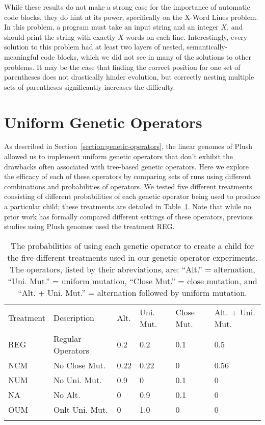 While these results do not make a strong case for the importance of automatic code blocks, they do hint at its power, specifically on the X-Word Lines problem. In this problem, a program must take an input string and an integer $X$, and should print the string with exactly $X$ words on each line. Interestingly, every solution to this problem had at least two layers of nested, semantically-meaningful code blocks, which we did not see in many of the solutions to other problems. It may be the case that finding the correct position for one set of parentheses does not drastically hinder evolution, but correctly nesting multiple sets of parentheses significantly increases the difficulty.


\section{Uniform Genetic Operators}

As described in Section~\ref{section:genetic-operators}, the linear genomes of Plush allowed us to implement uniform genetic operators that don't exhibit the 
drawbacks often associated with tree-based genetic operators. Here we explore the efficacy of each of these operators by comparing sets of runs using different combinations and probabilities of operators. We tested five different treatments consisting of different probabilities of each genetic operator being used to produce a particular child; these treatments are detailed in Table~\ref{genetic-operator-combinations}. Note that while no prior work has formally compared different settings of these operators, previous studies using Plush genomes \citep{Helmuth:2015:GECCO, Helmuth:2015:GPTP, McPhee:2015:GPTP} used the treatment REG.

\begin{table}[t]
\centering
\caption{The probabilities of using each genetic operator to create a child for the five different treatments used in our genetic operator experiments. The operators, listed by their abreviations, are:
``Alt.'' = alternation,
``Uni. Mut.'' = uniform mutation,
``Close Mut.'' = close mutation, and
``Alt. + Uni. Mut.'' = alternation followed by uniform mutation.}
\label{genetic-operator-combinations}
\begin{tabular}{ll llll}
\hline\noalign{\smallskip}
Treatment & Description & Alt. & Uni. Mut. & Close Mut. & Alt. + Uni. Mut. \\
\noalign{\smallskip}\svhline\noalign{\smallskip}
REG & Regular Operators &  0.2 &  0.2 &  0.1 &  0.5  \\
NCM & No Close Mut.  &  0.22 &  0.22 &  0 &  0.56  \\
NUM & No Uni. Mut. &  0.9 &  0 &  0.1 &  0  \\
NA  & No Alt. &  0 &  0.9 &  0.1 &  0  \\
OUM & Onlt Uni. Mut. &  0 &  1.0 &  0 &  0  \\
\noalign{\smallskip}\hline\noalign{\smallskip}
\end{tabular}
\end{table}

